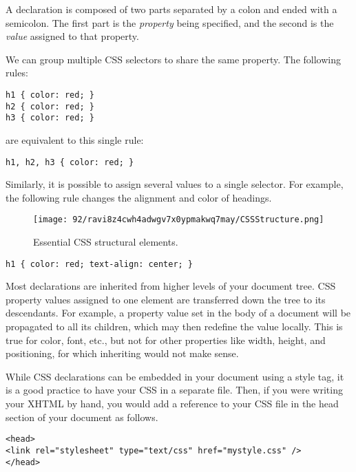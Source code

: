 \documentclass[a4paper,10pt,twoside]{book}
\newcommand{\ct}[1]{{\small\ttfamily\textup{#1}}}
\begin{document}
A declaration is composed of two parts separated by a colon and ended with a semicolon. The first part is the \textit{property} being specified, and the second is the \textit{value} assigned to that property.

We can group multiple CSS selectors to share the same property. The following rules:

\begin{lstlisting}
h1 { color: red; }
h2 { color: red; }
h3 { color: red; }
\end{lstlisting}

are equivalent to this single rule:

\begin{lstlisting}
h1, h2, h3 { color: red; }
\end{lstlisting}

Similarly, it is possible to assign several values to a single selector. For example, the following rule changes the alignment and color of headings.

\begin{figure}[h!tbp]
	\begin{center}
		\texttt{[image: 92/ravi8z4cwh4adwgv7x0ypmakwq7may/CSSStructure.png]}
		\caption{Essential CSS structural elements.\label{book:fundamentals:css:principles:cssstru}}
	\end{center}
\end{figure}


\begin{lstlisting}
h1 { color: red; text-align: center; }
\end{lstlisting}

Most declarations are inherited from higher levels of your document tree. CSS property values assigned to one element are transferred down the tree to its descendants. For example, a property value set in the body of a document will be propagated to all its children, which may then redefine the value locally. This is true for color, font, etc., but not for other properties like width, height, and positioning, for which inheriting would not make sense.

While CSS declarations can be embedded in your document using a \ct{style} tag, it is a good practice to have your CSS in a separate file. Then, if you were writing your XHTML by hand, you would add a reference to your CSS file in the head section of your document as follows.

\begin{lstlisting}
<head>
<link rel="stylesheet" type="text/css" href="mystyle.css" />
</head>
\end{lstlisting}
\end{document}
